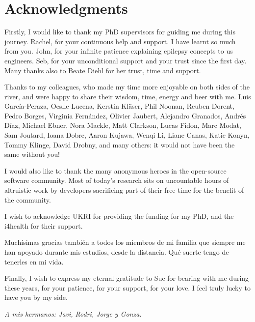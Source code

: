 \chapter{Acknowledgments}

Firstly, I would like to thank my PhD supervisors for guiding me during this journey.
Rachel, for your continuous help and support.
I have learnt so much from you.
John, for your infinite patience explaining epilepsy concepts to us engineers.
Seb, for your unconditional support and your trust since the first day.
Many thanks also to Beate Diehl for her trust, time and support.

Thanks to my colleagues, who made my time more enjoyable on both sides of the river, and were happy to share their wisdom, time, energy and beer with me.
Luis García-Peraza, Oeslle Lucena, Kerstin Kläser, Phil Noonan, Reuben Dorent, Pedro Borges, Virginia Fernández, Olivier Jaubert, Alejandro Granados, Andrés Díaz, Michael Ebner, Nora Mackle, Matt Clarkson, Lucas Fidon, Marc Modat, Sam Joutard, Ioana Dobre, Aaron Kujawa, Wenqi Li, Liane Canas, Katie Konyn, Tommy Klinge, David Drobny, and many others: it would not have been the same without you!

I would also like to thank the many anonymous heroes in the open-source software community.
Most of today's research sits on uncountable hours of altruistic work by developers sacrificing part of their free time for the benefit of the community.

I wish to acknowledge \ac{UKRI} for providing the funding for my PhD, and the \ac{i4health} for their support.

Muchísimas gracias también a todos los miembros de mi familia que siempre me han apoyado durante mis estudios, desde la distancia.
Qué suerte tengo de tenerles en mi vida.

Finally, I wish to express my eternal gratitude to Sue for bearing with me during these years, for your patience, for your support, for your love.
I feel truly lucky to have you by my side.

\clearpage
\begin{center}
    \raggedleft
    \vspace*{\fill}
    \textit{A mis hermanos: Javi, Rodri, Jorge y Gonza.}
    \vspace*{\fill}
\end{center}
\clearpage
